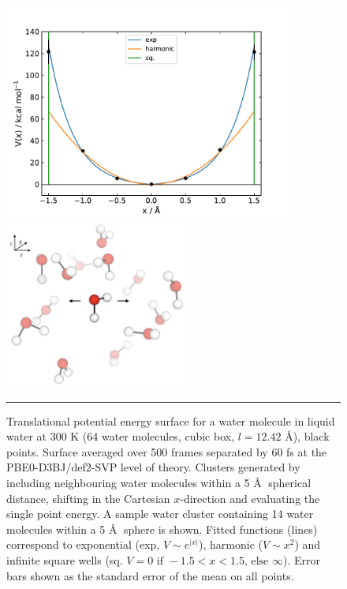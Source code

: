 \documentclass[../main.tex]{subfiles}
\begin{document}
\begin{figure}[h!]
	\centering
	\begin{minipage}[b]{0.6\textwidth}
		\includegraphics[width=9.5cm]{4/figs/figX3/dft_well.pdf}
	\end{minipage}
	\hfill
	\begin{minipage}[b]{0.39\textwidth}
		\includegraphics[width=6cm]{4/figs/figX3/dft_well_trns.png}
		\vspace{0.7cm}
	\end{minipage}
	\vspace{0.2cm}
	\hrule
	\caption{Translational potential energy surface for a water molecule in liquid water at 300 K (64 water molecules, cubic box, $l = 12.42$ \AA), black points. Surface averaged over 500 frames separated by 60 fs at the PBE0-D3BJ/def2-SVP level of theory. Clusters generated by including neighbouring water molecules within a 5 \AA$\;$ spherical distance, shifting in the Cartesian $x$-direction and evaluating the single point energy. A sample water cluster containing 14 water molecules within a 5 \AA$\;$ sphere is shown. Fitted functions (lines) correspond to exponential (exp, $V \sim e^{|x|}$), harmonic ($V \sim x^2$) and infinite square wells (sq. $V = 0 \text{ if }-1.5 < x < 1.5\text{, else } \infty$). Error bars shown as the standard error of the mean on all points.}
	\label{fig::entropy_X3a}
\end{figure}
\end{document}
